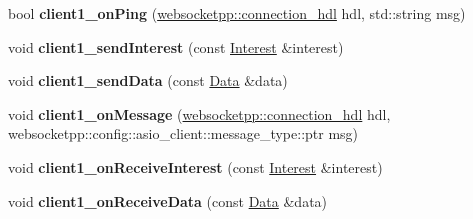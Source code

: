 \begin{DoxyCompactItemize}
\item 
bool {\bfseries client1\+\_\+on\+Ping} (\hyperlink{namespacewebsocketpp_a6b3d26a10ee7229b84b776786332631d}{websocketpp\+::connection\+\_\+hdl} hdl, std\+::string msg)\hypertarget{classnfd_1_1tests_1_1EndToEndFixture_adeaf59286bb89d7c6f402e4c273b73e2}{}\label{classnfd_1_1tests_1_1EndToEndFixture_adeaf59286bb89d7c6f402e4c273b73e2}

\item 
void {\bfseries client1\+\_\+send\+Interest} (const \hyperlink{classndn_1_1Interest}{Interest} \&interest)\hypertarget{classnfd_1_1tests_1_1EndToEndFixture_ac91ceea455d3453e758d981fe8644a4e}{}\label{classnfd_1_1tests_1_1EndToEndFixture_ac91ceea455d3453e758d981fe8644a4e}

\item 
void {\bfseries client1\+\_\+send\+Data} (const \hyperlink{classndn_1_1Data}{Data} \&data)\hypertarget{classnfd_1_1tests_1_1EndToEndFixture_a5e60ec7f97c8512c261567565cdd8a9e}{}\label{classnfd_1_1tests_1_1EndToEndFixture_a5e60ec7f97c8512c261567565cdd8a9e}

\item 
void {\bfseries client1\+\_\+on\+Message} (\hyperlink{namespacewebsocketpp_a6b3d26a10ee7229b84b776786332631d}{websocketpp\+::connection\+\_\+hdl} hdl, websocketpp\+::config\+::asio\+\_\+client\+::message\+\_\+type\+::ptr msg)\hypertarget{classnfd_1_1tests_1_1EndToEndFixture_ae57809e483cdd34bcbbaed852f241e87}{}\label{classnfd_1_1tests_1_1EndToEndFixture_ae57809e483cdd34bcbbaed852f241e87}

\item 
void {\bfseries client1\+\_\+on\+Receive\+Interest} (const \hyperlink{classndn_1_1Interest}{Interest} \&interest)\hypertarget{classnfd_1_1tests_1_1EndToEndFixture_a12978d1bc64652877663ec1f1c218523}{}\label{classnfd_1_1tests_1_1EndToEndFixture_a12978d1bc64652877663ec1f1c218523}

\item 
void {\bfseries client1\+\_\+on\+Receive\+Data} (const \hyperlink{classndn_1_1Data}{Data} \&data)\hypertarget{classnfd_1_1tests_1_1EndToEndFixture_ae74c76a4dac73ef0c3c7d9ebba0a5c6f}{}\label{classnfd_1_1tests_1_1EndToEndFixture_ae74c76a4dac73ef0c3c7d9ebba0a5c6f}

\end{DoxyCompactItemize}

